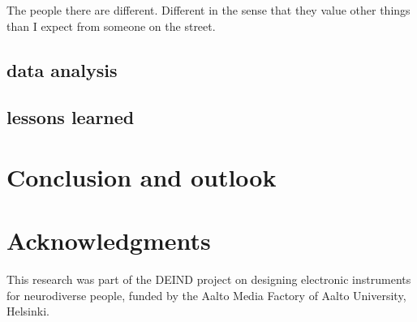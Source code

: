 \documentclass{acm_proc_article-sp}
\begin{document}
The people there are different. Different in the sense that they value other things than I expect from someone on the street.




\subsection{data analysis} %
\label{sub:data_analysis}


\subsection{lessons learned} %
\label{sub:lessons_learned}




\section{Conclusion and outlook} %
\label{sec:conclusion_and_outlook}





\section{Acknowledgments}
This research was part of the DEIND project on designing electronic instruments for neurodiverse people, funded by the Aalto Media Factory of Aalto University, Helsinki.  


 
\balancecolumns
\end{document}
